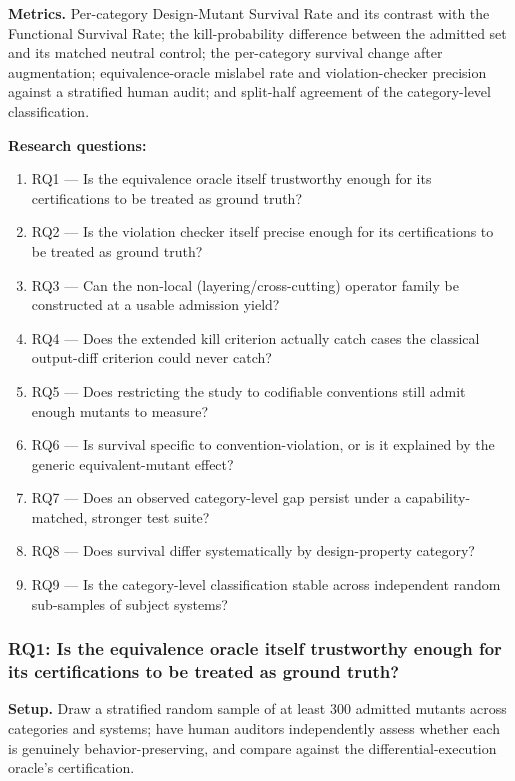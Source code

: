 \documentclass[11pt]{article}
\begin{document}
\textbf{Metrics.} Per-category Design-Mutant Survival Rate and its contrast with the Functional Survival Rate; the kill-probability difference between the admitted set and its matched neutral control; the per-category survival change after augmentation; equivalence-oracle mislabel rate and violation-checker precision against a stratified human audit; and split-half agreement of the category-level classification.

\textbf{Research questions:}
\begin{enumerate}[leftmargin=1.6em]
\item RQ1 --- Is the equivalence oracle itself trustworthy enough for its certifications to be treated as ground truth?
\item RQ2 --- Is the violation checker itself precise enough for its certifications to be treated as ground truth?
\item RQ3 --- Can the non-local (layering/cross-cutting) operator family be constructed at a usable admission yield?
\item RQ4 --- Does the extended kill criterion actually catch cases the classical output-diff criterion could never catch?
\item RQ5 --- Does restricting the study to codifiable conventions still admit enough mutants to measure?
\item RQ6 --- Is survival specific to convention-violation, or is it explained by the generic equivalent-mutant effect?
\item RQ7 --- Does an observed category-level gap persist under a capability-matched, stronger test suite?
\item RQ8 --- Does survival differ systematically by design-property category?
\item RQ9 --- Is the category-level classification stable across independent random sub-samples of subject systems?
\end{enumerate}

\subsubsection{RQ1: Is the equivalence oracle itself trustworthy enough for its certifications to be treated as ground truth?}
\textbf{Setup.} Draw a stratified random sample of at least 300 admitted mutants across categories and systems; have human auditors independently assess whether each is genuinely behavior-preserving, and compare against the differential-execution oracle's certification.
\end{document}
